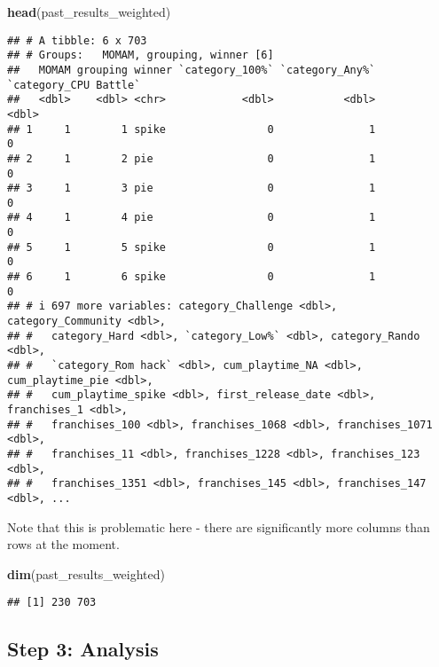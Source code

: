 \documentclass[
]{article}
\newenvironment{Shaded}{\begin{snugshade}}{\end{snugshade}}
\newcommand{\FunctionTok}[1]{\textcolor[rgb]{0.13,0.29,0.53}{\textbf{#1}}}
\newcommand{\NormalTok}[1]{#1}
\begin{document}
\begin{Shaded}
\begin{Highlighting}[]
\FunctionTok{head}\NormalTok{(past\_results\_weighted)}
\end{Highlighting}
\end{Shaded}

\begin{verbatim}
## # A tibble: 6 x 703
## # Groups:   MOMAM, grouping, winner [6]
##   MOMAM grouping winner `category_100%` `category_Any%` `category_CPU Battle`
##   <dbl>    <dbl> <chr>            <dbl>           <dbl>                 <dbl>
## 1     1        1 spike                0               1                     0
## 2     1        2 pie                  0               1                     0
## 3     1        3 pie                  0               1                     0
## 4     1        4 pie                  0               1                     0
## 5     1        5 spike                0               1                     0
## 6     1        6 spike                0               1                     0
## # i 697 more variables: category_Challenge <dbl>, category_Community <dbl>,
## #   category_Hard <dbl>, `category_Low%` <dbl>, category_Rando <dbl>,
## #   `category_Rom hack` <dbl>, cum_playtime_NA <dbl>, cum_playtime_pie <dbl>,
## #   cum_playtime_spike <dbl>, first_release_date <dbl>, franchises_1 <dbl>,
## #   franchises_100 <dbl>, franchises_1068 <dbl>, franchises_1071 <dbl>,
## #   franchises_11 <dbl>, franchises_1228 <dbl>, franchises_123 <dbl>,
## #   franchises_1351 <dbl>, franchises_145 <dbl>, franchises_147 <dbl>, ...
\end{verbatim}

Note that this is problematic here - there are significantly more
columns than rows at the moment.

\begin{Shaded}
\begin{Highlighting}[]
\FunctionTok{dim}\NormalTok{(past\_results\_weighted)}
\end{Highlighting}
\end{Shaded}

\begin{verbatim}
## [1] 230 703
\end{verbatim}

\hypertarget{step-3-analysis}{%
\subsection{Step 3: Analysis}\label{step-3-analysis}}
\end{document}
